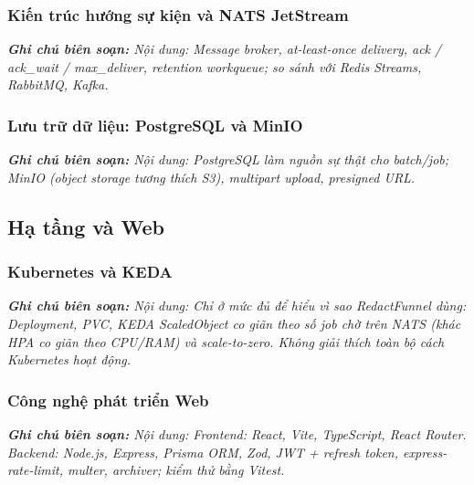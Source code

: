 \documentclass[a4paper,12pt]{article}
\begin{document}
\subsubsection{Kiến trúc hướng sự kiện và NATS JetStream}

{\small\itshape\noindent\textbf{Ghi chú biên soạn:} Nội dung: Message broker, at-least-once delivery, ack / ack\_wait / max\_deliver, retention workqueue; so sánh với Redis Streams, RabbitMQ, Kafka.\par\vspace{6pt}}


\subsubsection{Lưu trữ dữ liệu: PostgreSQL và MinIO}

{\small\itshape\noindent\textbf{Ghi chú biên soạn:} Nội dung: PostgreSQL làm nguồn sự thật cho batch/job; MinIO (object storage tương thích S3), multipart upload, presigned URL.\par\vspace{6pt}}


\subsection{Hạ tầng và Web}


\subsubsection{Kubernetes và KEDA}

{\small\itshape\noindent\textbf{Ghi chú biên soạn:} Nội dung: Chỉ ở mức đủ để hiểu vì sao RedactFunnel dùng: Deployment, PVC, KEDA ScaledObject co giãn theo số job chờ trên NATS (khác HPA co giãn theo CPU/RAM) và scale-to-zero. Không giải thích toàn bộ cách Kubernetes hoạt động.\par\vspace{6pt}}


\subsubsection{Công nghệ phát triển Web}

{\small\itshape\noindent\textbf{Ghi chú biên soạn:} Nội dung: Frontend: React, Vite, TypeScript, React Router. Backend: Node.js, Express, Prisma ORM, Zod, JWT + refresh token, express-rate-limit, multer, archiver; kiểm thử bằng Vitest.\par\vspace{6pt}}
\end{document}
